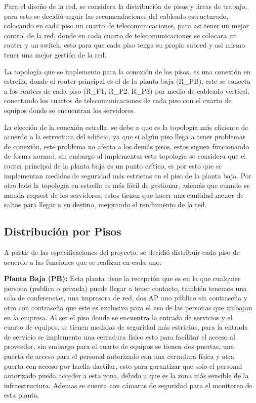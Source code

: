 \documentclass[letterpaper,11pt]{article}
\begin{document}
    Para el diseño de la red, se considera la distribución de pisos y áreas de trabajo, para esto se decidió seguir las recomendaciones del cableado estructurado, colocando en cada piso un cuarto de telecomunicaciones, para asi tener un mejor control de la red, donde en cada cuarto de telecomunicaciones se colocara un router y un switch, esto para que cada piso tenga su propia subred y asi mismo tener una mejor gestión de la red.
    
    La topología que se implemento para la conexión de los pisos, es una conexión en estrella, donde el router principal es el de la planta baja (R\_PB), este se conecta a los routers de cada piso (R\_P1, R\_P2, R\_P3) por medio de cableado vertical, conectando los cuartos de telecomunicaciones de cada piso con el cuarto de equipos donde se encuentran los servidores.

    La elección de la conexión estrella, se debe a que es la topología más eficiente de acuerdo a la estructura del edificio, ya que si algún piso llega a tener problemas de conexión, este problema no afecta a los demás pisos, estos siguen funcionando de forma normal, sin embargo al implementar esta topología se considera que el router principal de la planta baja es un punto crítico, es por esto que se implementan medidas de seguridad más estrictas en el piso de la planta baja. Por otro lado la topología en estrella es más fácil de gestionar, además que cuando se manda request de los servidores, estos tienen que hacer una cantidad menor de saltos para llegar a su destino, mejorando el rendimiento de la red.
    
    \subsection{Distribución por Pisos}

    A partir de las especificaciones  del proyecto, se decidió distribuir cada piso de acuerdo a las funciones que se realizan en cada uno:

    \textbf{Planta Baja (PB):} Esta planta tiene la recepción que es en la que cualquier persona (publica o privada) puede llegar a tener contacto,
    también tenemos una sala de conferencias, una impresora de red, dos AP
    uno público sin contraseña y otro con contraseña que este es exclusivo para el uso de las personas que trabajan en la empresa. Al ser el piso donde se encuentra la entrada de servicios y el cuarto de equipos, se tienen medidas de seguridad más estrictas, para la entrada de servicio se implemento una cerradura físico esto para facilitar el acceso al proveedor, sin embargo para el cuarto de equipos se tienen dos puertas, una puerta de acceso para el personal autorizado con una cerradura física y otra puerta con acceso por huella dactilar, esto para garantizar que solo el personal autorizado pueda acceder a esta zona, debido a que es la zona más sensible de la infraestructura. Ademas se cuenta con cámaras de seguridad para el monitoreo de esta planta.
\end{document}
